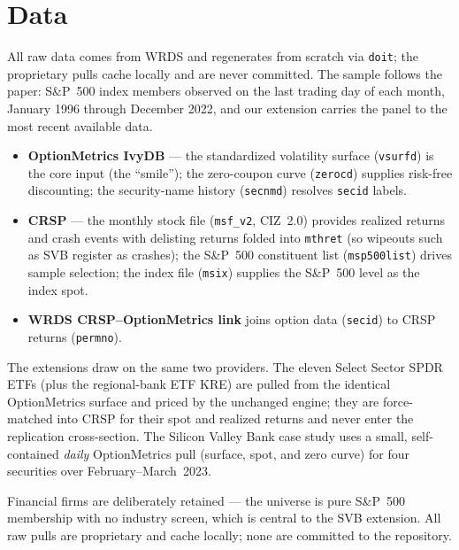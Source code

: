 \documentclass[12pt]{article}
\begin{document}
\section{Data}
All raw data comes from WRDS and regenerates from scratch via \texttt{doit}; the
proprietary pulls cache locally and are never committed. The sample follows the
paper: S\&P~500 index members observed on the last trading day of each month,
January 1996 through December 2022, and our extension carries the panel to the
most recent available data.

\begin{itemize}
  \item \textbf{OptionMetrics IvyDB} --- the standardized volatility surface
    (\texttt{vsurfd}) is the core input (the ``smile''); the zero-coupon curve
    (\texttt{zerocd}) supplies risk-free discounting; the security-name history
    (\texttt{secnmd}) resolves \texttt{secid} labels.
  \item \textbf{CRSP} --- the monthly stock file (\texttt{msf\_v2}, CIZ~2.0)
    provides realized returns and crash events with delisting returns folded into
    \texttt{mthret} (so wipeouts such as SVB register as crashes); the S\&P~500
    constituent list (\texttt{msp500list}) drives sample selection; the index file
    (\texttt{msix}) supplies the S\&P~500 level as the index spot.
  \item \textbf{WRDS CRSP--OptionMetrics link} joins option data (\texttt{secid})
    to CRSP returns (\texttt{permno}).
\end{itemize}

The extensions draw on the same two providers. The eleven Select Sector SPDR ETFs
(plus the regional-bank ETF KRE) are pulled from the identical OptionMetrics surface
and priced by the unchanged engine; they are force-matched into CRSP for their spot
and realized returns and never enter the replication cross-section. The Silicon
Valley Bank case study uses a small, self-contained \emph{daily} OptionMetrics pull
(surface, spot, and zero curve) for four securities over February--March~2023.

Financial firms are deliberately retained --- the universe is pure S\&P~500
membership with no industry screen, which is central to the SVB extension. All raw
pulls are proprietary and cache locally; none are committed to the repository.

\end{document}
